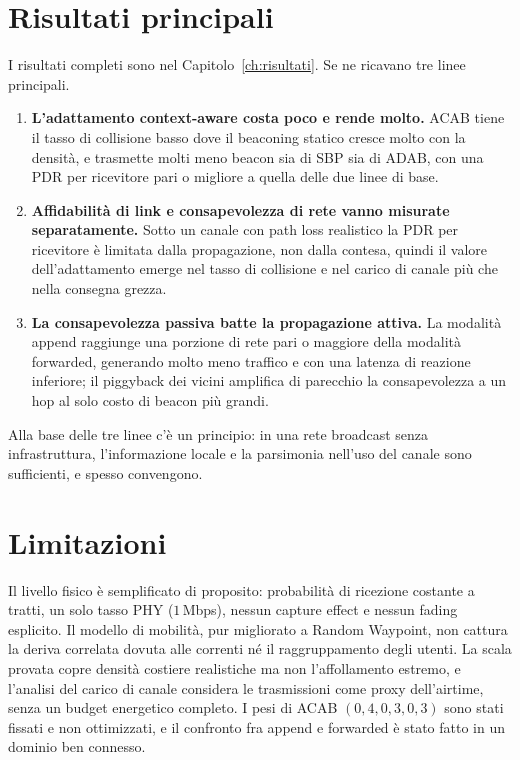 \section{Risultati principali}
\label{sec:concl-risultati}
I risultati completi sono nel Capitolo~\ref{ch:risultati}. Se ne ricavano tre
linee principali.
\begin{enumerate}[leftmargin=1.4em]
  \item \textbf{L'adattamento context-aware costa poco e rende molto.} ACAB tiene
  il tasso di collisione basso dove il beaconing statico cresce molto con la
  densit\`a, e trasmette molti meno beacon sia di SBP sia di ADAB, con una PDR per
  ricevitore pari o migliore a quella delle due linee di base.
  \item \textbf{Affidabilit\`a di link e consapevolezza di rete vanno misurate
  separatamente.} Sotto un canale con path loss realistico la PDR per ricevitore
  \`e limitata dalla propagazione, non dalla contesa, quindi il valore
  dell'adattamento emerge nel tasso di collisione e nel carico di canale pi\`u
  che nella consegna grezza.
  \item \textbf{La consapevolezza passiva batte la propagazione attiva.} La
  modalit\`a append raggiunge una porzione di rete pari o maggiore della
  modalit\`a forwarded, generando molto meno traffico e con una latenza di
  reazione inferiore; il piggyback dei vicini amplifica di parecchio la
  consapevolezza a un hop al solo costo di beacon pi\`u grandi.
\end{enumerate}
Alla base delle tre linee c'\`e un principio: in una rete broadcast senza
infrastruttura, l'informazione locale e la parsimonia nell'uso del canale sono
sufficienti, e spesso convengono.

\section{Limitazioni}
\label{sec:concl-limiti}
Il livello fisico \`e semplificato di proposito: probabilit\`a di ricezione
costante a tratti, un solo tasso PHY ($1\,$Mbps), nessun capture effect e nessun
fading esplicito. Il modello di mobilit\`a, pur migliorato a Random Waypoint, non
cattura la deriva correlata dovuta alle correnti n\'e il raggruppamento degli
utenti. La scala provata copre densit\`a costiere realistiche ma non
l'affollamento estremo, e l'analisi del carico di canale considera le
trasmissioni come proxy dell'airtime, senza un budget energetico completo. I pesi
di ACAB $(0{,}4, 0{,}3, 0{,}3)$ sono stati fissati e non ottimizzati, e il
confronto fra append e forwarded \`e stato fatto in un dominio ben connesso.

